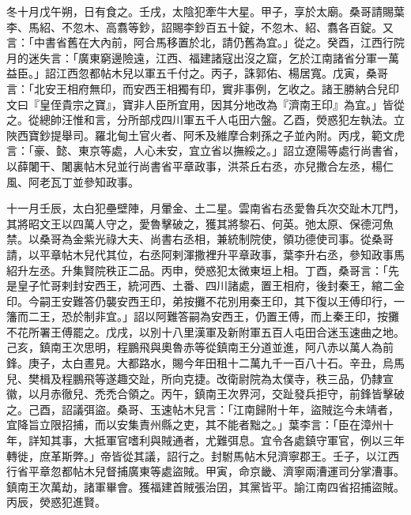 \begin{pinyinscope}
 冬十月戊午朔，日有食之。壬戌，太陰犯牽牛大星。甲子，享於太廟。桑哥請賜葉李、馬紹、不忽木、高翥等鈔，詔賜李鈔百五十錠，不忽木、紹、翥各百錠。又言：「中書省舊在大內前，阿合馬移置於北，請仍舊為宜。」從之。癸酉，江西行院月的迷失言：「廣東窮邊險遠，江西、福建諸寇出沒之窟，乞於江南諸省分軍一萬益臣。」詔江西忽都帖木兒以軍五千付之。丙子，誅郭佑、楊居寬。戊寅，桑哥言：「北安王相府無印，而安西王相獨有印，實非事例，乞收之。諸王勝納合兒印文曰『皇侄貴宗之寶』，寶非人臣所宜用，因其分地改為『濟南王印』為宜。」皆從之。從總帥汪惟和言，分所部戍四川軍五千人屯田六盤。乙酉，熒惑犯左執法。立陜西寶鈔提舉司。羅北甸土官火者、阿禾及維摩合剌孫之子並內附。丙戌，範文虎言：「豪、懿、東京等處，人心未安，宜立省以撫綏之。」詔立遼陽等處行尚書省，以薛闍干、闍裏帖木兒並行尚書省平章政事，洪茶丘右丞，亦兒撒合左丞，楊仁風、阿老瓦丁並參知政事。



 十一月壬辰，太白犯壘壁陣，月暈金、土二星。雲南省右丞愛魯兵次交趾木兀門，其將昭文王以四萬人守之，愛魯擊破之，獲其將黎石、何英。弛太原、保德河魚禁。以桑哥為金紫光祿大夫、尚書右丞相，兼統制院使，領功德使司事。從桑哥請，以平章帖木兒代其位，右丞阿剌渾撒裡升平章政事，葉李升右丞，參知政事馬紹升左丞。升集賢院秩正二品。丙申，熒惑犯太微東垣上相。丁酉，桑哥言：「先是皇子忙哥剌封安西王，統河西、土番、四川諸處，置王相府，後封秦王，綰二金印。今嗣王安難答仍襲安西王印，弟按攤不花別用秦王印，其下復以王傅印行，一籓而二王，恐於制非宜。」詔以阿難答嗣為安西王，仍置王傅，而上秦王印，按攤不花所署王傅罷之。戊戌，以別十八里漢軍及新附軍五百人屯田合迷玉速曲之地。己亥，鎮南王次思明，程鵬飛與奧魯赤等從鎮南王分道並進，阿八赤以萬人為前鋒。庚子，太白晝見。大都路水，賜今年田租十二萬九千一百八十石。辛丑，烏馬兒、樊楫及程鵬飛等遂趣交趾，所向克捷。改衛尉院為太僕寺，秩三品，仍隸宣徽，以月赤徹兒、禿禿合領之。丙午，鎮南王次界河，交趾發兵拒守，前鋒皆擊破之。己酉，詔議弭盜。桑哥、玉速帖木兒言：「江南歸附十年，盜賊迄今未靖者，宜降旨立限招捕，而以安集責州縣之吏，其不能者黜之。」葉李言：「臣在漳州十年，詳知其事，大抵軍官嗜利與賊通者，尤難弭息。宜令各處鎮守軍官，例以三年轉徙，庶革斯弊。」帝皆從其議，詔行之。封駙馬帖木兒濟寧郡王。壬子，以江西行省平章忽都帖木兒督捕廣東等處盜賊。甲寅，命京畿、濟寧兩漕運司分掌漕事。鎮南王次萬劫，諸軍畢會。獲福建首賊張治囝，其黨皆平。諭江南四省招捕盜賊。丙辰，熒惑犯進賢。




\end{pinyinscope}
